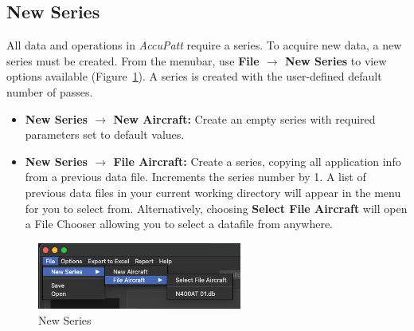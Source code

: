 \documentclass[10pt,letterpaper,titlepage]{article}
\begin{document}
    \subsection{New Series}
    All data and operations in \textit{AccuPatt} require a series. To acquire new data, a new series must be created. From the menubar, use \textbf{File $\rightarrow$ New Series} to view options available (Figure~\ref{fig:new_series}). A series is created with the user-defined default number of passes.
    \begin{itemize}
        \item \textbf{New Series $\rightarrow$ New Aircraft:} Create an empty series with required parameters set to default values.
        \item \textbf{New Series $\rightarrow$ File Aircraft:} Create a series, copying all application info from a previous data file. Increments the series number by 1. A list of previous data files in your current working directory will appear in the menu for you to select from. Alternatively, choosing \textbf{Select File Aircraft} will open a File Chooser allowing you to select a datafile from anywhere.
    \end{itemize}
    \begin{figure}[hb]
        \centering
        \includegraphics[width=0.6\textwidth]{new_series}
        \caption{New Series}
        \label{fig:new_series}
    \end{figure}
    
\end{document}
